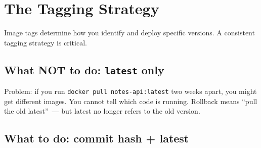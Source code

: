 \setcounter{section}{4}
\section{The Tagging Strategy}\label{19-artifact-storage:195-the-tagging-strategy}

Image tags determine how you identify and deploy specific versions. A consistent tagging strategy is critical.

\subsection*{\texorpdfstring{What NOT to do: \texttt{latest} only}{What NOT to do: latest only}}\label{19-artifact-storage:what-not-to-do-latest-only}

\begin{codebox}[short]

\begin{Shaded}
\begin{Highlighting}[]

\end{Highlighting}
\end{Shaded}

\end{codebox}

\noindent{}Problem: if you run \texttt{docker\ pull\ notes-}\allowbreak{}\texttt{api:}\allowbreak{}\texttt{latest} two weeks apart, you might get different images. You cannot tell which code is running. Rollback means ``pull the old latest''~--- but latest no longer refers to the old version.

\subsection*{What to do: commit hash + latest}\label{19-artifact-storage:what-to-do-commit-hash--latest}

